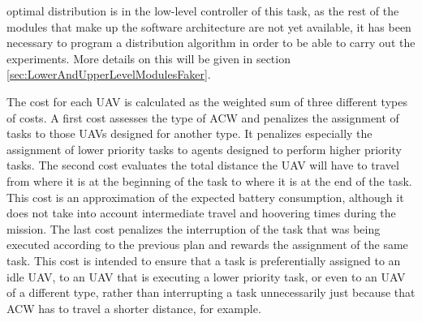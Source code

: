 optimal distribution is in the low-level controller of this task, as the rest of the modules that make up the software architecture are not yet available, it has been necessary to program a distribution algorithm in order to be able to carry out the experiments. More details on this will be given in section \ref{sec:LowerAndUpperLevelModulesFaker}.

The cost for each \gls{UAV} is calculated as the weighted sum of three different types of costs. A first cost assesses the type of \gls{ACW} and penalizes the assignment of tasks to those \glspl{UAV} designed for another type. It penalizes especially the assignment of lower priority tasks to agents designed to perform higher priority tasks. The second cost evaluates the total distance the \gls{UAV} will have to travel from where it is at the beginning of the task to where it is at the end of the task. This cost is an approximation of the expected battery consumption, although it does not take into account intermediate travel and hoovering times during the mission. The last cost penalizes the interruption of the task that was being executed according to the previous plan and rewards the assignment of the same task. This cost is intended to ensure that a task is preferentially assigned to an idle \gls{UAV}, to an \gls{UAV} that is executing a lower priority task, or even to an \gls{UAV} of a different type, rather than interrupting a task unnecessarily just because that \gls{ACW} has to travel a shorter distance, for example.

